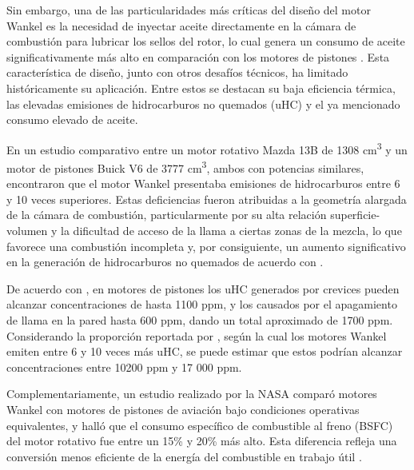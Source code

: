\documentclass{LS}
\begin{document}
Sin embargo, una de las particularidades más críticas del diseño del motor Wankel es la necesidad de inyectar aceite directamente en la cámara de combustión para lubricar los sellos del rotor, lo cual genera un consumo de aceite significativamente más alto en comparación con los motores de pistones \cite{elbahja2023}. Esta característica de diseño, junto con otros desafíos técnicos, ha limitado históricamente su aplicación. Entre estos se destacan su baja eficiencia térmica, las elevadas emisiones de hidrocarburos no quemados (uHC) y el ya mencionado consumo elevado de aceite.

En un estudio comparativo entre un motor rotativo Mazda 13B de 1308 cm\textsuperscript{3} y un motor de pistones Buick V6 de 3777 cm\textsuperscript{3}, ambos con potencias similares, \cite{cole1976} encontraron que el motor Wankel presentaba emisiones de hidrocarburos entre 6 y 10 veces superiores. Estas deficiencias fueron atribuidas a la geometría alargada de la cámara de combustión, particularmente por su alta relación superficie-volumen y la dificultad de acceso de la llama a ciertas zonas de la mezcla, lo que favorece una combustión incompleta y, por consiguiente, un aumento significativo en la generación de hidrocarburos no quemados de acuerdo con \cite{yamamoto1972}. 

De acuerdo con \cite{kuppa2019}, en motores de pistones los uHC generados por crevices pueden alcanzar concentraciones de hasta 1100 ppm, y los causados por el apagamiento de llama en la pared hasta 600 ppm, dando un total aproximado de 1700 ppm. Considerando la proporción reportada por \cite{cole1976}, según la cual los motores Wankel emiten entre 6 y 10 veces más uHC, se puede estimar que estos podrían alcanzar concentraciones entre 10200 ppm y 17 000 ppm.


Complementariamente, un estudio realizado por la NASA comparó motores Wankel con motores de pistones de aviación bajo condiciones operativas equivalentes, y halló que el consumo específico de combustible al freno (BSFC) del motor rotativo fue entre un 15\% y 20\% más alto. Esta diferencia refleja una conversión menos eficiente de la energía del combustible en trabajo útil \cite{nasa1984}.
\end{document}
